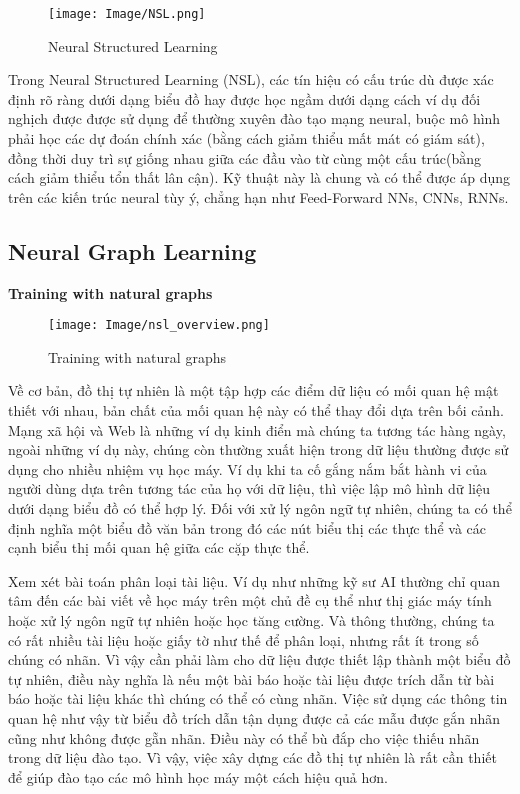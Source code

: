 \begin{figure}[h!]
    \centering
    \texttt{[image: Image/NSL.png]}
    \caption {Neural Structured Learning}
    \label{Hình 1.2: Neural Structured Learning}
    \cite*{WEBSITE:4}
\end{figure}

Trong Neural Structured Learning (NSL), các tín hiệu có cấu trúc dù được xác định rõ ràng dưới dạng biểu đồ hay được học ngầm dưới dạng cách ví dụ đối nghịch được 
được sử dụng để thường xuyên đào tạo mạng neural, buộc mô hình phải học các dự đoán chính xác (bằng cách giảm thiểu mất mát có giám sát), đồng thời duy trì sự giống nhau giữa các đầu vào từ 
cùng một cấu trúc(bằng cách giảm thiểu tổn thất lân cận). Kỹ thuật này là chung và có thể được áp dụng trên các kiến trúc neural tùy ý, chẳng hạn như Feed-Forward NNs, CNNs, RNNs. 


\subsection{Neural Graph Learning}

\textbf{Training with natural graphs}

\begin{figure}[h!]
    \centering
    \texttt{[image: Image/nsl\_overview.png]}
    \caption{Training with natural graphs}
    \label{Hình 1.3: Training with natural graphs}
    \cite*{WEBSITE:4}
\end{figure}

Về cơ bản, đồ thị tự nhiên là một tập hợp các điểm dữ liệu có mối quan hệ mật thiết với nhau, bản chất của mối quan hệ này có thể thay đổi dựa trên bối cảnh.
Mạng xã hội và Web là những ví dụ kinh điển mà chúng ta tương tác hàng ngày, ngoài những ví dụ này, chúng còn thường xuất hiện trong dữ liệu thường được sử dụng
cho nhiều nhiệm vụ học máy. Ví dụ khi ta cố gắng nắm bắt hành vi của người dùng dựa trên tương tác của họ với dữ liệu, thì việc lập mô hình dữ liệu dưới dạng biểu đồ 
có thể hợp lý. Đối với xử lý ngôn ngữ tự nhiên, chúng ta có thể định nghĩa một biểu đồ văn bản trong đó các nút biểu thị các thực thể và các cạnh biểu thị mối quan hệ 
giữa các cặp thực thể.

Xem xét bài toán phân loại tài liệu. Ví dụ như những kỹ sư AI thường chỉ quan tâm đến các bài viết về học máy trên một chủ đề cụ thể như thị giác máy tính hoặc xử lý ngôn ngữ
tự nhiên hoặc học tăng cường. Và thông thường, chúng ta có rất nhiều tài liệu hoặc giấy tờ như thế để phân loại, nhưng rất ít trong số chúng có nhãn. Vì vậy cần phải làm cho 
dữ liệu được thiết lập thành một biểu đồ tự nhiên, điều này nghĩa là nếu một bài báo hoặc tài liệu được trích dẫn từ bài báo hoặc tài liệu khác thì chúng có thể có cùng nhãn.
Việc sử dụng các thông tin quan hệ như vậy từ biểu đồ trích dẫn tận dụng được cả các mẫu được gắn nhãn cũng như không được gẵn nhãn. Điều này có thể bù đắp cho việc thiếu nhãn 
trong dữ liệu đào tạo. Vì vậy, việc xây dựng các đồ thị tự nhiên là rất cần thiết để giúp đào tạo các mô hình học máy một cách hiệu quả hơn.

